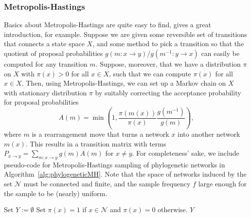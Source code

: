 \documentclass{article}
\theoremstyle{definition}
\begin{document}
\subsubsection{Metropolis-Hastings}\label{sec:MH}
Basics about Metropolis-Hastings are quite easy to find, \cite{doi:10.1080/00031305.1995.10476177} gives a great introduction, for example.
Suppose we are given some reversible set of transitions that connects a state space $X$, and some method to pick a transition so that the quotient of proposal probabilities $g(m:x\to y)/g(m^{-1}:y\to x)$ can easily be computed for any transition $m$. Suppose, moreover, that we have a distribution $\pi$ on $X$ with $\pi(x)>0$ for all $x\in X$, such that we can compute $\pi(x)$ for all $x\in X$. Then, using Metropolis-Hastings, we can set up a Markov chain on $X$ with stationary distribution $\pi$ by suitably correcting the acceptance probability for proposal probabilities 
\[A(m) = \min\left(1, \frac{\pi(m(x))}{\pi(x)} \frac{g(m^{-1})}{g(m)} \right),\]
where $m$ is a rearrangement move that turns a network $x$ into another network $m(x)$.
This results in a transition matrix with terms $P_{x\to y} = \sum_{m:x\to y} g(m) A(m)$ for $x\neq y$. 
For completeness' sake, we include pseudo-code for Metropolis-Hastings sampling of phylogenetic networks in Algorithm~\ref{alg:phylogeneticMH}. Note that the space of networks induced by the set $\mathcal{N}$ must be connected and finite, and the sample frequency $f$ large enough for the sample to be (nearly) uniform.



\vspace{\baselineskip}
\begin{algorithm}[ht]
 Set $Y:=\emptyset$\;
 Set $\pi(x)=1$ if $x\in\mathcal{N}$ and $\pi(x)=0$ otherwise.
\Return $Y$\;
\caption{\textsc{Metropolis-Hastings}$(\mathcal{N},N, n, f)$}\label{alg:phylogeneticMH}
\end{algorithm}
\vspace{\baselineskip}
\end{document}
